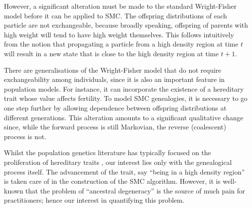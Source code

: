 \documentclass{article}
\begin{document}
However, a significant alteration must be made to the standard Wright-Fisher model before it can be applied to SMC. The offspring distributions of each particle are not exchangeable, because broadly speaking, offspring of parents with high weight will tend to have high weight themselves. This follows intuitively from the notion that propagating a particle from a high density region at time $t$ will result in a new state that is close to the high density region at time $t+1$.

There are generalisations of the Wright-Fisher model that do not require exchangeability among individuals, since it is also an important feature in population models. For instance, it can incorporate the existence of a hereditary trait whose value affects fertility. To model SMC genealogies, it is necessary to go one step further by allowing dependence between offspring distributions at different generations. This alteration amounts to a significant qualitative change since, while the forward process is still Markovian, the reverse (coalescent) process is not.

Whilst the population genetics literature has typically focused on the proliferation of hereditary traits \citep[Chapter 3]{wakeley2009}, our interest lies only with the genealogical process itself. The advancement of the trait, say ``being in a high density region'' is taken care of in the construction of the SMC algorithm. However, it is well-known that the problem of ``ancestral degeneracy'' is the source of much pain for practitioners; hence our interest in quantifying this problem.
\end{document}
